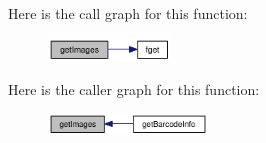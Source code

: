 Here is the call graph for this function:\nopagebreak
\begin{figure}[H]
\begin{center}
\leavevmode
\includegraphics[width=92pt]{product_8inc_ac7b378120072ec50fd998c962a419a2_cgraph}
\end{center}
\end{figure}


Here is the caller graph for this function:\nopagebreak
\begin{figure}[H]
\begin{center}
\leavevmode
\includegraphics[width=120pt]{product_8inc_ac7b378120072ec50fd998c962a419a2_icgraph}
\end{center}
\end{figure}
